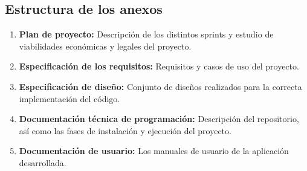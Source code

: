 \subsection{Estructura de los anexos}
\begin{enumerate}
	\item  \textbf{Plan de proyecto:}  Descripción de los distintos sprints y estudio de viabilidades económicas y legales del proyecto.
	\item  \textbf{Especificación de los requisitos:} Requisitos y casos de uso del proyecto.
	\item  \textbf{Especificación de diseño:} Conjunto de diseños realizados para la correcta implementación del código.
	\item  \textbf{Documentación técnica de programación:} Descripción del repositorio, así como las fases de instalación y ejecución del proyecto.
	\item  \textbf{Documentación de usuario:}  Los manuales de usuario de la aplicación desarrollada.
\end{enumerate}